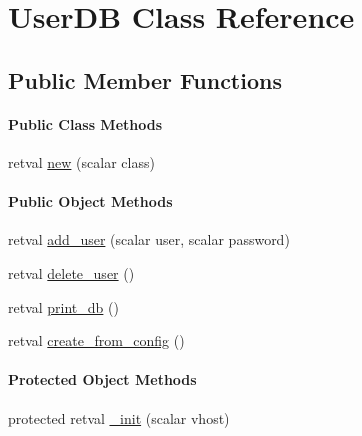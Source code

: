 \hypertarget{classxmpproxy_1_1_user_d_b}{
\section{\-User\-D\-B \-Class \-Reference}
\label{classxmpproxy_1_1_user_d_b}
}
\subsection*{\-Public \-Member \-Functions}
\begin{Indent}\paragraph*{\-Public \-Class \-Methods}
\begin{DoxyCompactItemize}
\item 
retval \hyperlink{classxmpproxy_1_1_user_d_b_a04de1185dad12c1c24cac9235c2bbeff}{new} (scalar class)
\end{DoxyCompactItemize}
\end{Indent}
\begin{Indent}\paragraph*{\-Public \-Object \-Methods}
\begin{DoxyCompactItemize}
\item 
retval \hyperlink{classxmpproxy_1_1_user_d_b_a9558637a81be1f86e876248d3de65e04}{add\-\_\-user} (scalar user, scalar password)
\item 
retval \hyperlink{classxmpproxy_1_1_user_d_b_a4ebc7d4ffc5f0799da7bcf45f0096268}{delete\-\_\-user} ()
\item 
retval \hyperlink{classxmpproxy_1_1_user_d_b_a8fdf3d941954e92a923b9937acf72d19}{print\-\_\-db} ()
\item 
retval \hyperlink{classxmpproxy_1_1_user_d_b_a0c577732d2a28e7663282be4feedf8c5}{create\-\_\-from\-\_\-config} ()
\end{DoxyCompactItemize}
\end{Indent}
\begin{Indent}\paragraph*{\-Protected \-Object \-Methods}
\begin{DoxyCompactItemize}
\item 
protected retval \hyperlink{classxmpproxy_1_1_user_d_b_a6336a956e6a42f44ff038bf4d18a6583}{\-\_\-init} (scalar vhost)
\end{DoxyCompactItemize}
\end{Indent}



